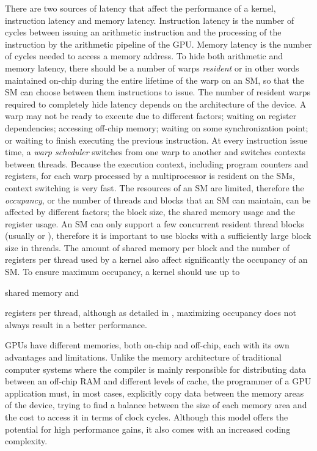 \documentclass{ws-ijait}
\begin{document}
There are two sources of latency that affect the performance of a kernel, instruction latency and memory latency. Instruction latency is the number of cycles between issuing an arithmetic instruction and the processing of the instruction by the arithmetic pipeline of the GPU. Memory latency is the number of cycles needed to access a memory address. To hide both arithmetic and memory latency, there should be a number of warps \textit{resident} or in other words maintained on-chip during the entire lifetime of the warp on an SM, so that the SM can choose between them instructions to issue. The number of resident warps required to completely hide latency depends on the architecture of the device. A warp may not be ready to execute due to different factors; waiting on register dependencies; accessing off-chip memory; waiting on some synchronization point; or waiting to finish executing the previous instruction. At every instruction issue time, a \textit{warp scheduler} switches from one warp to another and switches contexts between threads. Because the execution context, including program counters and registers, for each warp processed by a multiprocessor is resident on the SMs, context switching is very fast. The resources of an SM are limited, therefore the \textit{occupancy}, or the number of threads and blocks that an SM can maintain, can be affected by different factors; the block size, the shared memory usage and the register usage. An SM can only support a few concurrent resident thread blocks (usually  or ), therefore it is important to use blocks with a sufficiently large block size in threads. The amount of shared memory per block and the number of registers per thread used by a kernel also affect significantly the occupancy of an SM. To ensure maximum occupancy, a kernel should use up to



\noindent
shared memory and 



\noindent
registers per thread, although as detailed in \cite{Volkov2010}, maximizing occupancy does not always result in a better performance.

GPUs have different memories, both on-chip and off-chip, each with its own advantages and limitations. Unlike the memory architecture of traditional computer systems where the compiler is mainly responsible for distributing data between an off-chip RAM and different levels of cache, the programmer of a GPU application must, in most cases, explicitly copy data between the memory areas of the device, trying to find a balance between the size of each memory area and the cost to access it in terms of clock cycles. Although this model offers the potential for high performance gains, it also comes with an increased coding complexity.
\end{document}

